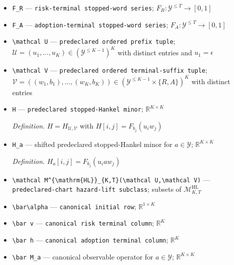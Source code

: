 \documentclass{article}
\begin{document}
\begin{itemize}
  \par\smallskip\noindent\emph{Definition.} \(M_a=B_aK_0\)
  \item \texttt{F\_\allowbreak{}R} --- \texttt{risk-\allowbreak{}terminal stopped-\allowbreak{}word series}; \(F_R:\mathcal Y^{\le T}\to[0,1]\)
  \item \texttt{F\_\allowbreak{}A} --- \texttt{adoption-\allowbreak{}terminal stopped-\allowbreak{}word series}; \(F_A:\mathcal Y^{\le T}\to[0,1]\)
  \item \texttt{\textbackslash{}\allowbreak{}mathcal U} --- \texttt{predeclared ordered prefix tuple}; \(\mathcal U=(u_1,\ldots,u_K)\in(\mathcal Y^{\le K-1})^K\) with distinct entries and \(u_1=\epsilon\)
  \item \texttt{\textbackslash{}\allowbreak{}mathcal V} --- \texttt{predeclared ordered terminal-\allowbreak{}suffix tuple}; \(\mathcal V=((w_1,b_1),\ldots,(w_K,b_K))\in(\mathcal Y^{\le K-1}\times\{R,A\})^K\) with distinct entries
  \item \texttt{H} --- \texttt{predeclared stopped-\allowbreak{}Hankel minor}; \(\mathbb R^{K\times K}\)
  \par\smallskip\noindent\emph{Definition.} \(H=H_{\mathcal U,\mathcal V}\) with \(H[i,j]=F_{b_j}(u_iw_j)\)
  \item \texttt{H\_\allowbreak{}a} --- shifted predeclared stopped-Hankel minor for \(a\in\mathcal Y\); \(\mathbb R^{K\times K}\)
  \par\smallskip\noindent\emph{Definition.} \(H_a[i,j]=F_{b_j}(u_i a w_j)\)
  \item \texttt{\textbackslash{}\allowbreak{}mathcal M\textasciicircum{}\{\textbackslash{}\allowbreak{}mathrm\{HL\}\allowbreak{}\}\allowbreak{}\_\allowbreak{}\{K,\allowbreak{}T\}\allowbreak{}(\textbackslash{}\allowbreak{}mathcal U,\allowbreak{}\textbackslash{}\allowbreak{}mathcal V)} --- \texttt{predeclared-\allowbreak{}chart hazard-\allowbreak{}lift subclass}; subsets of \(\mathcal M^{\mathrm{HL}}_{K,T}\)
  \item \texttt{\textbackslash{}\allowbreak{}bar\textbackslash{}\allowbreak{}alpha} --- \texttt{canonical initial row}; \(\mathbb R^{1\times K}\)
  \item \texttt{\textbackslash{}\allowbreak{}bar v} --- \texttt{canonical risk terminal column}; \(\mathbb R^K\)
  \item \texttt{\textbackslash{}\allowbreak{}bar h} --- \texttt{canonical adoption terminal column}; \(\mathbb R^K\)
  \item \texttt{\textbackslash{}\allowbreak{}bar M\_\allowbreak{}a} --- canonical observable operator for \(a\in\mathcal Y\); \(\mathbb R^{K\times K}\)

\end{itemize}
\end{document}
